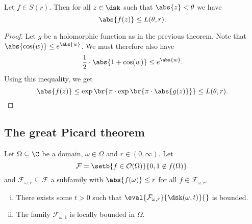 \begin{izrek}[Schottky]
Let $f \in S(r)$. Then for all $z \in \dsk$ such that
$\abs{z} < \theta$ we have
\[
\abs{f(z)} \leq L(\theta, r).
\]
\end{izrek}

\begin{proof}
Let $g$ be a holomorphic function as in the previous theorem. Note
that $\abs{\cos(w)} \leq e^{\abs{w}}$. We must therefore also have
\[
\frac{1}{2} \cdot \abs{1 + \cos(w)} \leq e^{\abs{w}}.
\]
Using this inequality, we get
\[
\abs{f(z)} \leq
\exp \br{\pi \cdot \exp \br{\pi \cdot \abs{g(z)}}} \leq
L(\theta, r). \qedhere
\]
\end{proof}

\newpage

\subsection{The great Picard theorem}


\begin{lema}
Let $\Omega \subseteq \C$ be a domain, $\omega \in \Omega$ and
$r \in (0, \infty)$. Let
\[
\mathcal{F} =
\setb{f \in \mathcal{O}(\Omega)}{0, 1 \not \in f(\Omega)}.
\]
and $\mathcal{F}_{\omega,r} \subseteq \mathcal{F}$ a subfamily with
$\abs{f(\omega)} \leq r$ for all $f \in \mathcal{F}_{\omega,r}$.

\begin{enumerate}[i)]
\item There exists some $t > 0$ such that
$\eval{\mathcal{F}_{\omega,r}}{\dsk(\omega,t)}{}$ is bounded.
\item The family $\mathcal{F}_{\omega,1}$ is locally bounded in
$\Omega$.
\end{enumerate}
\end{lema}


